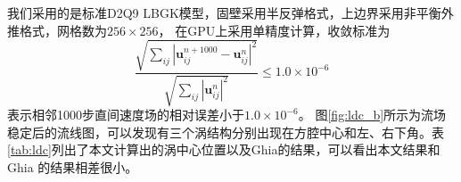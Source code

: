 我们采用的是标准D2Q9 LBGK模型，固壁采用半反弹格式，上边界采用非平衡外推格式，网格数为$256\times 256$，
在GPU上采用单精度计算，收敛标准为
\begin{equation}
  \frac{\sqrt {\sum\nolimits_{ij}{| \bm u_{ij}^{n+1000}- \bm u_{ij}^{n} |^2}}}{\sqrt{\sum\nolimits_{ij}{|  \bm u_{ij}^{n} |^2}}}\le 1.0\times {{10}^{-6}}
  \label{convege}
\end{equation}
表示相邻1000步直间速度场的相对误差小于$1.0\times 10^{-6}$。 
图\ref{fig:ldc_b}所示为流场稳定后的流线图，可以发现有三个涡结构分别出现在方腔中心和左、右下角。表
\ref{tab:ldc}列出了本文计算出的涡中心位置以及Ghia的结果，可以看出本文结果和Ghia
的结果相差很小。
\begin{figure}[htb]
  \centering
\end{figure}
